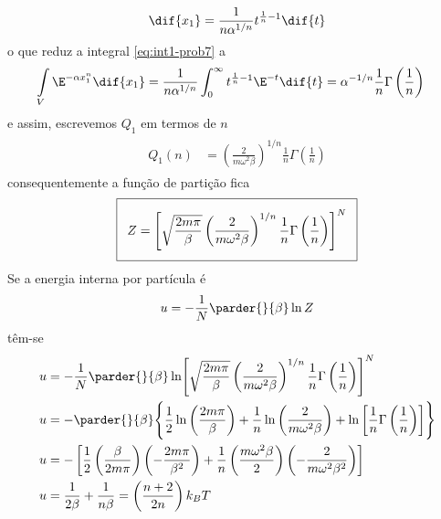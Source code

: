 \begin{prob}
\begin{sol}
\begin{enumerate}[label=\alph *)]
      \begin{align}
        \dif{x_1}=\frac{1}{n\alpha^{1/n}}t^{\frac{1}{n}-1}\dif{t}
      \end{align}
      o que reduz a integral \eqref{eq:int1-prob7} a
      \begin{align}
        \int\limits_{V}\E^{-\alpha x_1^n}\dif{x_1}&=\frac{1}{n\alpha^{1/n}}\int_{0}^\infty t^{\frac{1}{n}-1}\E^{-t}\dif{t}=\alpha^{-1/n}\frac{1}{n}\Gamma\left(\frac{1}{n}\right)
      \end{align}
      e assim, escrevemos $Q_1$ em termos de $n$
      \begin{align}
        \begin{split}
          Q_1(n)&=\left(\frac{2}{m\omega^2\beta}\right)^{1/n}\frac{1}{n}\Gamma\left(\frac{1}{n}\right)
        \end{split}
      \end{align}
      consequentemente a função de partição fica     
      \begin{align}
        \addtolength{\fboxsep}{5pt}
        \boxed{
          \begin{gathered}
            Z=\Biggl[\sqrt{\frac{2m\pi}{\beta}}\left(\frac{2}{m\omega^2\beta}\right)^{1/n}\frac{1}{n}\Gamma\left(\frac{1}{n}\right)\Biggr]^N
          \end{gathered}
        }
      \end{align}
      Se a energia interna por partícula é
      \begin{align}
        u=-\frac{1}{N}\parder{}{\beta}\ln Z
      \end{align}
      têm-se
      \begin{align}
        \begin{split}
          u&=-\frac{1}{N}\parder{}{\beta}\ln \Biggl[\sqrt{\frac{2m\pi}{\beta}}\left(\frac{2}{m\omega^2\beta}\right)^{1/n}\frac{1}{n}\Gamma\left(\frac{1}{n}\right)\Biggr]^N\\
          u&=-\parder{}{\beta}\Biggl\{\frac{1}{2}\ln\left(\frac{2m\pi}{\beta}\right)+\frac{1}{n}\ln\left(\frac{2}{m\omega^2\beta}\right)+\ln\left[\frac{1}{n}\Gamma\left(\frac{1}{n}\right)\right]\Biggr\}\\
          u&=-\left[\frac{1}{2}\left(\frac{\beta}{2m\pi}\right)\left(-\frac{2m\pi}{\beta^2}\right)+\frac{1}{n}\left(\frac{m\omega^2\beta}{2}\right)\left(-\frac{2}{m\omega^2\beta^2}\right)\right]\\
          u&=\frac{1}{2\beta}+\frac{1}{n\beta}=\left(\frac{n+2}{2n}\right)k_BT
        \end{split}

\end{align}
\end{enumerate}
\end{sol}
\end{prob}
